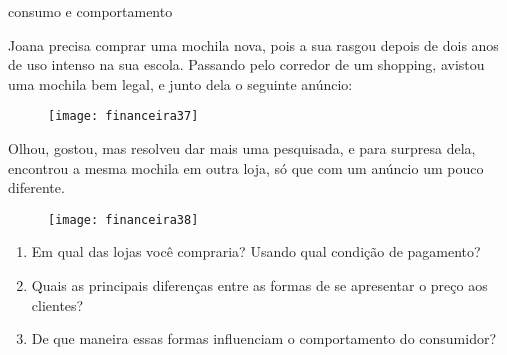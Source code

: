 \begin{task}{consumo e comportamento}
\label{fin-ativ-38}

Joana precisa comprar uma mochila nova, pois a sua rasgou depois de dois anos de uso intenso na sua escola. Passando pelo corredor de um shopping, avistou uma mochila bem legal, e junto dela o seguinte anúncio:

\begin{figure}[H]
\centering

\texttt{[image: financeira37]}
\end{figure}

Olhou, gostou, mas resolveu dar mais uma pesquisada, e para surpresa dela, encontrou a mesma mochila em outra loja, só que com um anúncio um pouco diferente.

\begin{figure}[H]
\centering

\texttt{[image: financeira38]}
\end{figure}

\begin{enumerate}
  \item Em qual das lojas você compraria? Usando qual condição de pagamento?
  \item Quais as principais diferenças entre as formas de se apresentar o preço aos clientes?
  \item De que maneira essas formas influenciam o comportamento do consumidor?
\end{enumerate}
\end{task}

